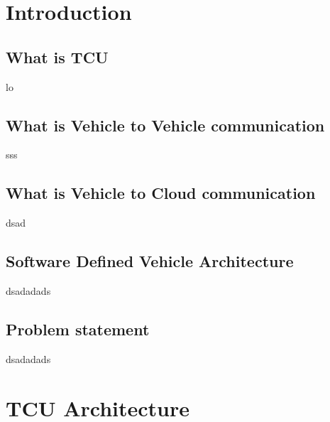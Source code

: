 \documentclass[
12pt,
oneside, 
onehalfspacing, 
nolistspacing, 
parskip, 
chapterinoneline, 
]{AASTCOMPUTER}
\begin{document}
\clearpage
\tableofcontents 
\cleardoublepage
{}
{} 
\listoffigures
\cleardoublepage
{}
{} 
\listoftables
\cleardoublepage

\listofabbre
{}

\mainmatter 
\pagestyle{thesis} 

\chapter{Introduction}
\section{What is TCU}
lo
\section{What is Vehicle to Vehicle communication}
sss
\section{What is Vehicle to Cloud communication}
dsad
\section{Software Defined Vehicle Architecture}
dsadadads
\section{Problem statement}
dsadadads
\chapter{TCU Architecture}
\end{document}
